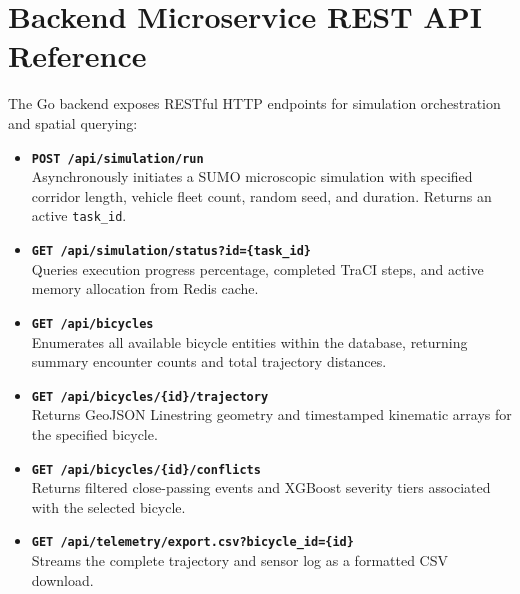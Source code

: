 \section{Backend Microservice REST API Reference}
The Go backend exposes RESTful HTTP endpoints for simulation orchestration and spatial querying:
\begin{itemize}
    \item \textbf{\texttt{POST /api/simulation/run}}\\
    Asynchronously initiates a SUMO microscopic simulation with specified corridor length, vehicle fleet count, random seed, and duration. Returns an active \texttt{task\_id}.
    \item \textbf{\texttt{GET /api/simulation/status?id=\{task\_id\}}}\\
    Queries execution progress percentage, completed TraCI steps, and active memory allocation from Redis cache.
    \item \textbf{\texttt{GET /api/bicycles}}\\
    Enumerates all available bicycle entities within the database, returning summary encounter counts and total trajectory distances.
    \item \textbf{\texttt{GET /api/bicycles/\{id\}/trajectory}}\\
    Returns GeoJSON Linestring geometry and timestamped kinematic arrays for the specified bicycle.
    \item \textbf{\texttt{GET /api/bicycles/\{id\}/conflicts}}\\
    Returns filtered close-passing events and XGBoost severity tiers associated with the selected bicycle.
    \item \textbf{\texttt{GET /api/telemetry/export.csv?bicycle\_id=\{id\}}}\\
    Streams the complete trajectory and sensor log as a formatted CSV download.
\end{itemize}
